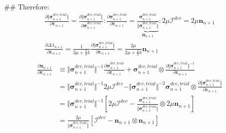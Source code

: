 \documentclass[]{scrartcl}
\begin{document}
\begin{easylist}
\begin{gather*}
\end{gather*}
## Therefore:
\begin{gather*}
\frac{\partial \Vert \boldsymbol{\sigma}^{dev, trial}_{n+1} \Vert}{\partial \boldsymbol{\varepsilon}_{n+1}}
  = \frac{\partial \Vert \boldsymbol{\sigma}^{dev, trial}_{n+1} \Vert}{\partial \boldsymbol{\sigma}^{dev, trial}_{n+1}} : \frac{\partial \boldsymbol{\sigma}^{dev, trial}_{n+1}}{\partial \boldsymbol{\varepsilon}_{n+1}}
  = \underbrace{\frac{\boldsymbol{\sigma}^{dev, trial}_{n+1}}{\Vert\boldsymbol{\sigma}^{dev, trial}_{n+1}\Vert}}_{\boldsymbol{n}_{n+1}} : 2 \mu \boldsymbol{\mathcal{I}}^{dev}
  = 2 \mu \boldsymbol{n}_{n+1}
\\
\frac{\partial \Delta \lambda_{n+1}}{\partial \boldsymbol{\varepsilon}_{n+1}}
  = \frac{1}{{2 \mu + \frac{2}{3} k}} \frac{\partial \Vert \boldsymbol{\sigma}^{dev, trial}_{n+1} \Vert}{\partial \boldsymbol{\varepsilon}_{n+1}}
  = \frac{2 \mu}{{2 \mu + \frac{2}{3} k}} \boldsymbol{n}_{n+1}  \\
\end{gather*}
\begin{align*}
\frac{\partial \boldsymbol{n}_{n+1}}{\partial \boldsymbol{\varepsilon}_{n+1}}
 &\equiv \Vert \boldsymbol{\sigma}^{dev, trial}_{n+1} \Vert^{-1} \frac{\partial \boldsymbol{\sigma}^{dev, trial}_{n+1}}{\partial \boldsymbol{\varepsilon}_{n+1}} 
  + \boldsymbol{\sigma}^{dev, trial}_{n+1} \otimes \frac{\partial \Vert \boldsymbol{\sigma}^{dev, trial}_{n+1} \Vert^{-1}}{\partial \boldsymbol{\varepsilon}_{n+1}} \\
 &= \Vert \boldsymbol{\sigma}^{dev, trial}_{n+1} \Vert^{-1} 2 \mu \boldsymbol{\mathcal{I}}^{dev} 
  - \Vert \boldsymbol{\sigma}^{dev, trial}_{n+1} \Vert^{-2} \boldsymbol{\sigma}^{dev, trial}_{n+1} \otimes \frac{\partial \Vert \boldsymbol{\sigma}^{dev, trial}_{n+1} \Vert}{\partial \boldsymbol{\varepsilon}_{n+1}} \\
 &= \Vert \boldsymbol{\sigma}^{dev, trial}_{n+1} \Vert^{-1} \left[ 2 \mu \boldsymbol{\mathcal{I}}^{dev} 
  - \frac{\boldsymbol{\sigma}^{dev, trial}_{n+1}}{\Vert \boldsymbol{\sigma}^{dev, trial}_{n+1} \Vert} \otimes 2 \mu \boldsymbol{n}_{n+1} \right] \\
 &= \frac{2\mu}{\Vert \boldsymbol{\sigma}^{dev, trial}_{n+1} \Vert} \left[ \boldsymbol{\mathcal{I}}^{dev} 
  - \boldsymbol{n}_{n+1} \otimes \boldsymbol{n}_{n+1} \right]

\end{align*}
\end{easylist}
\end{document}
